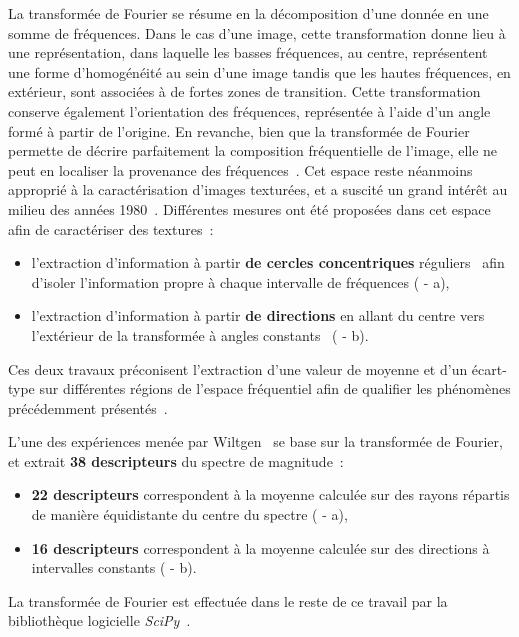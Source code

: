 La transformée de Fourier se résume en la décomposition d'une donnée en une somme de fréquences. Dans le cas d'une image, cette transformation donne lieu à une représentation, dans laquelle les basses fréquences, au centre, représentent une forme d'homogénéité au sein d'une image tandis que les hautes fréquences, en extérieur, sont associées à de fortes zones de transition. Cette transformation conserve également l'orientation des fréquences, représentée à l'aide d'un angle formé à partir de l'origine. En revanche, bien que la transformée de Fourier permette de décrire parfaitement la composition fréquentielle de l'image, elle ne peut en localiser la provenance des fréquences~\cite{Wiltgen2008}. Cet espace reste néanmoins approprié à la caractérisation d'images texturées, et a suscité un grand intérêt au milieu des années 1980~\cite{Persoon1986}. Différentes mesures ont été proposées dans cet espace afin de caractériser des textures~:
\begin{itemize}
    \item l'extraction d'information à partir \textbf{de cercles concentriques} réguliers~\cite{Smach2008a, Wiltgen2008} afin d'isoler l'information propre à chaque intervalle de fréquences ( - a),
    \item l'extraction d'information à partir \textbf{de directions} en allant du centre vers l'extérieur de la transformée à angles constants~\cite{Wiltgen2008} ( - b).
\end{itemize}
Ces deux travaux préconisent l'extraction d'une valeur de moyenne et d'un écart-type sur différentes régions de l'espace fréquentiel afin de qualifier les phénomènes précédemment présentés~\cite{Smach2008a, Wiltgen2008}. 

L'une des expériences menée par Wiltgen~ se base sur la transformée de Fourier, et extrait \textbf{38 descripteurs} du spectre de magnitude~:
\begin{itemize}
    \item \textbf{22 descripteurs} correspondent à la moyenne calculée sur des rayons répartis de manière équidistante du centre du spectre ( - a),
    \item \textbf{16 descripteurs} correspondent à la moyenne calculée sur des directions à intervalles constants ( - b).
\end{itemize}
La transformée de Fourier est effectuée dans le reste de ce travail par la bibliothèque logicielle \textit{SciPy}~\cite{Virtanen2020}.\par

